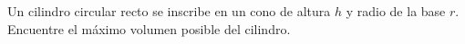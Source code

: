 \item Un cilindro circular recto se inscribe en un cono de altura $h$ y radio de la base $r$. Encuentre el máximo volumen posible del cilindro.
